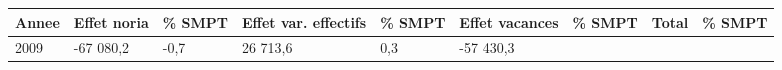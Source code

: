 \begin{longtable}[]{@{}lllllllll@{}}
\toprule
\begin{minipage}[b]{0.05\columnwidth}\raggedright
Annee\strut
\end{minipage} & \begin{minipage}[b]{0.10\columnwidth}\raggedright
Effet noria\strut
\end{minipage} & \begin{minipage}[b]{0.06\columnwidth}\raggedright
\% SMPT\strut
\end{minipage} & \begin{minipage}[b]{0.16\columnwidth}\raggedright
Effet var. effectifs\strut
\end{minipage} & \begin{minipage}[b]{0.06\columnwidth}\raggedright
\% SMPT\strut
\end{minipage} & \begin{minipage}[b]{0.12\columnwidth}\raggedright
Effet vacances\strut
\end{minipage} & \begin{minipage}[b]{0.06\columnwidth}\raggedright
\% SMPT\strut
\end{minipage} & \begin{minipage}[b]{0.09\columnwidth}\raggedright
Total\strut
\end{minipage} & \begin{minipage}[b]{0.06\columnwidth}\raggedright
\% SMPT\strut
\end{minipage}\tabularnewline
\midrule
\endhead
\begin{minipage}[t]{0.05\columnwidth}\raggedright
2009\strut
\end{minipage} & \begin{minipage}[t]{0.10\columnwidth}\raggedright
-67 080,2\strut
\end{minipage} & \begin{minipage}[t]{0.06\columnwidth}\raggedright
-0,7\strut
\end{minipage} & \begin{minipage}[t]{0.16\columnwidth}\raggedright
26 713,6\strut
\end{minipage} & \begin{minipage}[t]{0.06\columnwidth}\raggedright
0,3\strut
\end{minipage} & \begin{minipage}[t]{0.12\columnwidth}\raggedright
-57 430,3\strut
\end{minipage} & \begin{minipage}[t]{0.06\columnwidth}\raggedright

\end{minipage}
\end{longtable}
